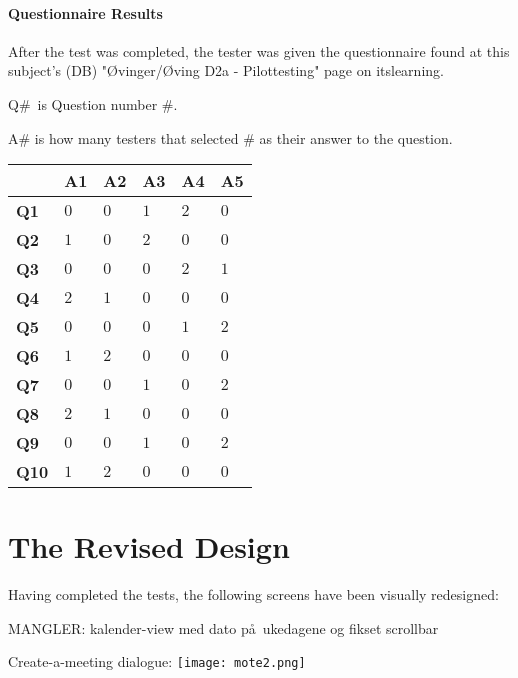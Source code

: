 \documentclass{article}
\begin{document}
\subsection{Questionnaire Results}

After the test was completed, the tester was given the questionnaire found
at this subject's (DB) "\O vinger/\O ving D2a - Pilottesting" page on
itslearning.

Q\#\ is Question number \#.

A\# is how many testers that selected \# as their answer to the question.

\begin{tabular}{|l|l|l|l|l|l|}
\hline
& \textbf{A1} & \textbf{A2} & \textbf{A3} & \textbf{A4} & \textbf{A5} \\ 
\hline
\textbf{Q1} & $0$ & $0$ & $1$ & $2$ & $0$ \\ \hline
\textbf{Q2} & $1$ & $0$ & $2$ & $0$ & $0$ \\ \hline
\textbf{Q3} & $0$ & $0$ & $0$ & $2$ & $1$ \\ \hline
\textbf{Q4} & $2$ & $1$ & $0$ & $0$ & $0$ \\ \hline
\textbf{Q5} & $0$ & $0$ & $0$ & $1$ & $2$ \\ \hline
\textbf{Q6} & $1$ & $2$ & $0$ & $0$ & $0$ \\ \hline
\textbf{Q7} & $0$ & $0$ & $1$ & $0$ & $2$ \\ \hline
\textbf{Q8} & $2$ & $1$ & $0$ & $0$ & $0$ \\ \hline
\textbf{Q9} & $0$ & $0$ & $1$ & $0$ & $2$ \\ \hline
\textbf{Q10} & $1$ & $2$ & $0$ & $0$ & $0$ \\ \hline
\end{tabular}
\newpage

\part{The Revised Design}

Having completed the tests, the following screens have been visually
redesigned:

\bigskip 

MANGLER: kalender-view med dato p\aa\ ukedagene og fikset scrollbar

Create-a-meeting dialogue: \newline
\texttt{[image: mote2.png]}\newline
\end{document}
